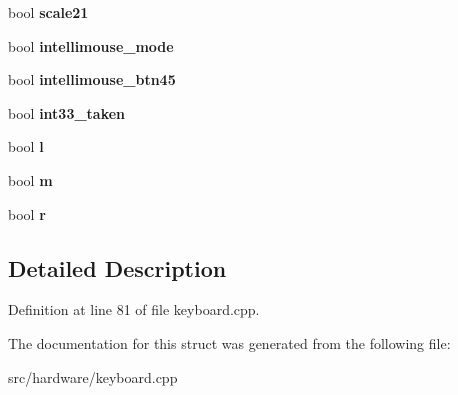 \begin{DoxyCompactItemize}
\item 
\hypertarget{structps2mouse_ab6d41806329d94ccd788853e8b6f36f3}{bool {\bfseries scale21}}\label{structps2mouse_ab6d41806329d94ccd788853e8b6f36f3}

\item 
\hypertarget{structps2mouse_afbc6ac0efb4991a79f66e5e5e2a89b19}{bool {\bfseries intellimouse\-\_\-mode}}\label{structps2mouse_afbc6ac0efb4991a79f66e5e5e2a89b19}

\item 
\hypertarget{structps2mouse_aa2d43c441bced55d4aa4bf18f42a3fb9}{bool {\bfseries intellimouse\-\_\-btn45}}\label{structps2mouse_aa2d43c441bced55d4aa4bf18f42a3fb9}

\item 
\hypertarget{structps2mouse_a24804c088c3b53b0e5425819a844cffc}{bool {\bfseries int33\-\_\-taken}}\label{structps2mouse_a24804c088c3b53b0e5425819a844cffc}

\item 
\hypertarget{structps2mouse_ad012940ddb2e6e826edc420d5cdc9871}{bool {\bfseries l}}\label{structps2mouse_ad012940ddb2e6e826edc420d5cdc9871}

\item 
\hypertarget{structps2mouse_ad94f7a068aab0cef083a02033d8c2671}{bool {\bfseries m}}\label{structps2mouse_ad94f7a068aab0cef083a02033d8c2671}

\item 
\hypertarget{structps2mouse_a38da8cabd941a1a374da3b35ef90ff35}{bool {\bfseries r}}\label{structps2mouse_a38da8cabd941a1a374da3b35ef90ff35}

\end{DoxyCompactItemize}


\subsection{Detailed Description}


Definition at line 81 of file keyboard.\-cpp.



The documentation for this struct was generated from the following file\-:\begin{DoxyCompactItemize}
\item 
src/hardware/keyboard.\-cpp\end{DoxyCompactItemize}
